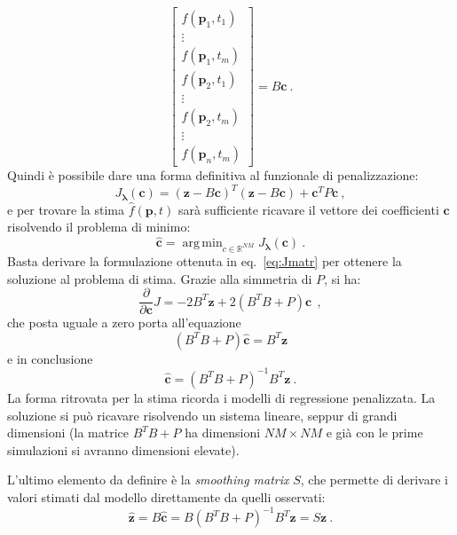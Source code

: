 \documentclass[a4paper,11pt,twoside,openright]{book}							%
\DeclareMathOperator*{\argmin}{arg\,min}
\begin{document}
$$
\begin{bmatrix}
f(\bm p_1,t_1)  \\
\vdots\\
f(\bm p_1,t_m)  \\
f(\bm p_2,t_1)  \\
\vdots\\
f(\bm p_2,t_m)  \\
\vdots\\
f(\bm p_n,t_m)
\end{bmatrix}= B \bm c \ .
$$
Quindi è possibile dare una forma definitiva al funzionale di penalizzazione:
\begin{equation} 
\label{eq:Jmatr}
J_{\bm \lambda }(\bm c) = (\bm z - B \bm c)^T (\bm z - B \bm c) + \bm c^T P \bm c \ ,
\end{equation}
e per trovare la stima $\hat{f}(\bm{p},t)$ sarà sufficiente ricavare il vettore dei coefficienti $\bm c$ risolvendo il problema di minimo:
$$
\hat{\bm{c}}=\argmin_{c \in \mathbb{R}^{NM}} J_{\bm \lambda }(\bm c) \ .
$$
Basta derivare la formulazione ottenuta in eq.~\eqref{eq:Jmatr} per ottenere la soluzione al problema di stima. Grazie alla simmetria di $P$, si ha:
$$
\frac{\partial}{\partial \bm c}J= -2 B^T \bm z + 2(B^T B + P) \bm c \ \ ,
$$
che posta uguale a zero porta all'equazione
$$
(B^T B + P) \hat  {\bm c} = B^T\bm z
$$ 
e in conclusione
\begin{equation}
\label{eq:sysnocovar}
\hat  {\bm c} = (B^T B + P)^{-1}B^T \bm z \ .
\end{equation} 
La forma ritrovata per la stima ricorda i modelli di regressione penalizzata. La soluzione si può ricavare risolvendo un sistema lineare, seppur di grandi dimensioni (la matrice $B^T B + P$ ha dimensioni $NM \times NM$ e già con le prime simulazioni si avranno dimensioni elevate).

L'ultimo elemento da definire è la \textit{smoothing matrix} $S$, che permette di derivare i valori stimati dal modello direttamente da quelli osservati:
$$
\hat  {\bm z} =B\hat  {\bm c} = B(B^T B + P)^{-1}B^T \bm z = S\bm{z} \ .
$$
\end{document}
